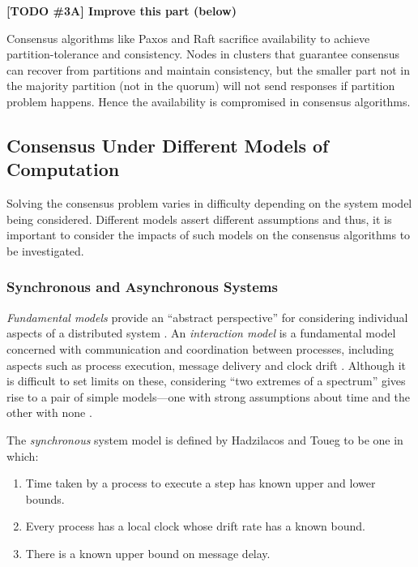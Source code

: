 \documentclass[12pt, a4paper]{article}
\newcommand{\todo}[2]{\textbf{\color{blue}[TODO \##1] #2}\par}
\begin{document}
\todo{3A}{Improve this part (below)}

Consensus algorithms like Paxos and Raft sacrifice availability to achieve partition-tolerance and consistency. Nodes in clusters that guarantee consensus can recover from partitions and maintain consistency, but the smaller part not in the majority partition (not in the quorum) will not send responses if partition problem happens. Hence the availability is compromised in consensus algorithms.

\subsection{Consensus Under Different Models of Computation} \label{sec:fundamental-models}
Solving the consensus problem varies in difficulty depending on the system model
being considered. Different models assert different assumptions and thus, it is
important to consider the impacts of such models on the consensus algorithms to
be investigated.

\subsubsection{Synchronous and Asynchronous Systems}
\textit{Fundamental models} provide an ``abstract perspective'' for considering
individual aspects of a distributed system \cite{coulouris2005distributed}. An
\textit{interaction model} is a fundamental model concerned with communication
and coordination between processes, including aspects such as process execution,
message delivery and clock drift \cite{coulouris2005distributed}. Although it is
difficult to set limits on these, considering ``two extremes of a spectrum''
gives rise to a pair of simple models---one with strong assumptions about time
and the other with none \cite{coulouris2005distributed, hadzilacos1994modular}.

The \textit{synchronous} system model is defined by Hadzilacos and Toueg
\cite{hadzilacos1994modular} to be one in which:

\begin{enumerate}
  \item Time taken by a process to execute a step has known upper and lower
    bounds.
  \item Every process has a local clock whose drift rate has a known bound.
  \item There is a known upper bound on message delay.
\end{enumerate}
\end{document}

